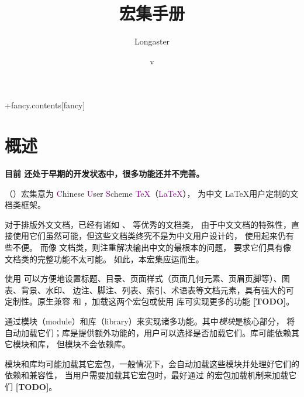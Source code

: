 \documentclass[twoside]{book}
\title{\CusTeX 宏集手册}
\author{Longaster}
\date{\zhtoday\quad v\UseName{cus@versi@n}}
\newcommand*{\TODO}{\textcolor{red!90!black}{\bfseries[TODO]}}
\begin{document}
\setlength{\lineskiplimit}{4pt}
\setlength{\lineskip}{4pt}

\def\thepage{t.\arabic{page}}
\maketitle

\frontmatter
\setpagestyle+{fancy.contents}[fancy]{}
\renewcommand{\contentsname}{总目录}
{\long\def\chaptermark#1{\mark{{\noexpand\hyperlink{\UseName{@currentHref}}{\contentsname}}{}}}
  \tableofcontents[ragged,outer-sep=0pt,sep=1.5em,2]}


\mainmatter
{}
\removebackground[./watermark]


\chapter{概述}

{\color{red}\bfseries 目前 \CusTeX 还处于早期的开发状态中，很多功能还并不完善。}

\CusTeX （\CusLaTeX）宏集意为 \textcolor{purple}Chinese \textcolor{purple}User
\textcolor{purple}Scheme \textcolor{purple}\TeX（\textcolor{purple}{\LaTeX}），
为中文 \LaTeX 用户定制的文档类框架。

对于排版外文文档，已经有诸如 、 等优秀的文档类，
由于中文文档的特殊性，直接使用它们虽然可能，但这些文档类终究不是为中文用户设计的，
使用起来仍有些不便。
而像  文档类，则注重解决输出中文的最根本的问题，
要求它们具有像  文档类的完整功能不太可能。
如此，本宏集应运而生。

使用 \CusTeX 可以方便地设置标题、目录、页面样式（页面几何元素、页眉页脚等）、图表、背景、水印、
边注、脚注、列表、索引、术语表等文档元素，具有强大的可定制性。\CusTeX 原生兼容  和 
，加载这两个宏包或使用  库可实现更多的功能 \TODO。

\CusTeX 通过模块（module）和库（library）来实现诸多功能。其中\emph{模块}是核心部分，
\CusTeX 将自动加载它们；库是提供额外功能的，用户可以选择是否加载它们。库可能依赖其它模块和库，
但模块不会依赖库。

模块和库均可能加载其它宏包，一般情况下，\CusTeX 会自动加载这些模块并处理好它们的依赖和兼容性，
当用户需要加载其它宏包时，最好通过 \CusTeX 的宏包加载机制来加载它们 \TODO。
\end{document}

